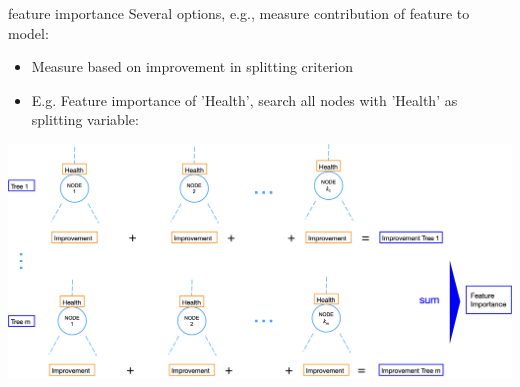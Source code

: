 \documentclass[11pt,compress,t,notes=noshow, xcolor=table]{beamer}
\begin{document}
\begin{vbframe}{feature importance}
Several options, e.g., measure contribution of feature to model:
    \begin{itemize}
        \item \small Measure based on improvement in splitting criterion
        \item \small E.g. Feature importance of 'Health', search all nodes with 'Health' as splitting variable:
    \end{itemize}


\includegraphics[width = \textwidth]{figure_man/nutshell-random-forest-feature-importance_split.png}
\end{vbframe}
\end{document}
